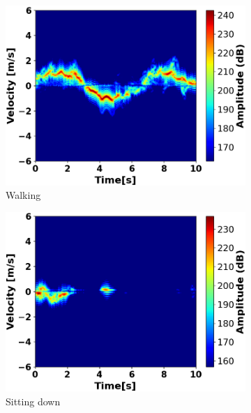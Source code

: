 \documentclass{l4proj}
\begin{document}
\begin{figure}[h]
   \centering
   \begin{subfigure}[b]{0.32\textwidth}
        \includegraphics[width=\textwidth]{images/Velocity-Time_1.png}
        \caption{Walking}
        \label{fig:velocity-time1}
    \end{subfigure}
    \hfill
    \begin{subfigure}[b]{0.32\textwidth}
        \includegraphics[width=\textwidth]{images/Velocity-Time_2.png}
        \caption{Sitting down}
        \label{fig:velocity-time2}
    \end{subfigure}
    \hfill
    \begin{subfigure}[b]{0.32\textwidth}

\end{subfigure}
\end{figure}
\end{document}
